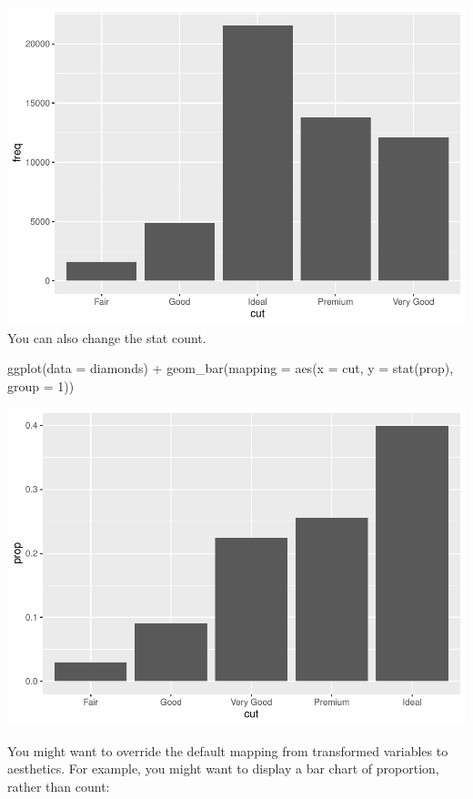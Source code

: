 \documentclass[
]{article}
\newenvironment{Shaded}{\begin{snugshade}}{\end{snugshade}}
\newcommand{\AttributeTok}[1]{\textcolor[rgb]{0.77,0.63,0.00}{#1}}
\newcommand{\DecValTok}[1]{\textcolor[rgb]{0.00,0.00,0.81}{#1}}
\newcommand{\FunctionTok}[1]{\textcolor[rgb]{0.00,0.00,0.00}{#1}}
\newcommand{\NormalTok}[1]{#1}
\newcommand{\SpecialCharTok}[1]{\textcolor[rgb]{0.00,0.00,0.00}{#1}}
\begin{document}
\includegraphics{Journal_files/figure-latex/unnamed-chunk-45-1.pdf} You
can also change the stat count.

\begin{Shaded}
\begin{Highlighting}[]
\FunctionTok{ggplot}\NormalTok{(}\AttributeTok{data =}\NormalTok{ diamonds) }\SpecialCharTok{+} 
  \FunctionTok{geom\_bar}\NormalTok{(}\AttributeTok{mapping =} \FunctionTok{aes}\NormalTok{(}\AttributeTok{x =}\NormalTok{ cut, }\AttributeTok{y =} \FunctionTok{stat}\NormalTok{(prop), }\AttributeTok{group =} \DecValTok{1}\NormalTok{))}
\end{Highlighting}
\end{Shaded}

\includegraphics{Journal_files/figure-latex/unnamed-chunk-46-1.pdf}

You might want to override the default mapping from transformed
variables to aesthetics. For example, you might want to display a bar
chart of proportion, rather than count:
\end{document}
